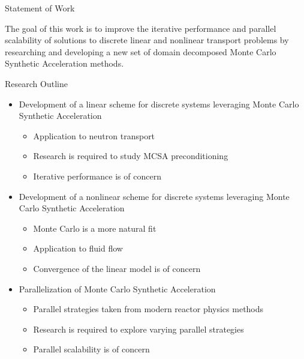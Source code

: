 \documentclass{beamer}
\begin{document}
\begin{frame}{Statement of Work}

The goal of this work is to improve the iterative performance and
parallel scalability of solutions to discrete linear and nonlinear
transport problems by researching and developing a new set of domain
decomposed Monte Carlo Synthetic Acceleration methods.

\end{frame}

\begin{frame}{Research Outline}
  \begin{itemize}
  \item Development of a linear scheme for discrete systems leveraging
    Monte Carlo Synthetic Acceleration
    \medskip
    \begin{itemize}
    \item Application to neutron transport
    \item Research is required to study MCSA preconditioning
    \item Iterative performance is of concern
    \end{itemize}
    \bigskip
  \item Development of a nonlinear scheme for discrete systems
    leveraging Monte Carlo Synthetic Acceleration
    \begin{itemize}
    \item Monte Carlo is a more natural fit
    \item Application to fluid flow
    \item Convergence of the linear model is of concern
    \end{itemize}
    \bigskip
  \item Parallelization of Monte Carlo Synthetic Acceleration
    \medskip
    \begin{itemize}
    \item Parallel strategies taken from modern reactor physics
      methods
    \item Research is required to explore varying parallel strategies
    \item Parallel scalability is of concern
    \end{itemize}
  \end{itemize}
\end{frame}
\end{document}
